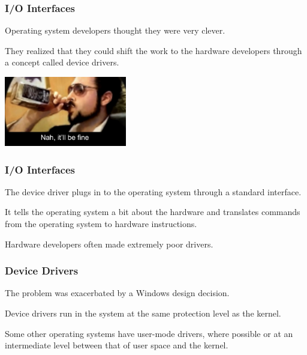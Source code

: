 \begin{frame}
\frametitle{I/O Interfaces}

Operating system developers thought they were very clever. 

They realized that they could shift the work to the hardware developers through a concept called \alert{device drivers}. 

\begin{center}
	\includegraphics[width=0.4\textwidth]{images/befine.jpg}
\end{center}

\end{frame}

\begin{frame}
\frametitle{I/O Interfaces}

The device driver plugs in to the operating system through a standard interface. 

It tells the operating system a bit about the hardware and translates commands from the operating system to hardware instructions. 

Hardware developers often made extremely poor drivers.

\end{frame}

\begin{frame}
\frametitle{Device Drivers}

The problem was exacerbated by a Windows design decision.

Device drivers run in the system at the same protection level as the kernel. 

Some other operating systems have user-mode drivers, where possible or at an intermediate level between that of user space and the kernel. 

\end{frame}

